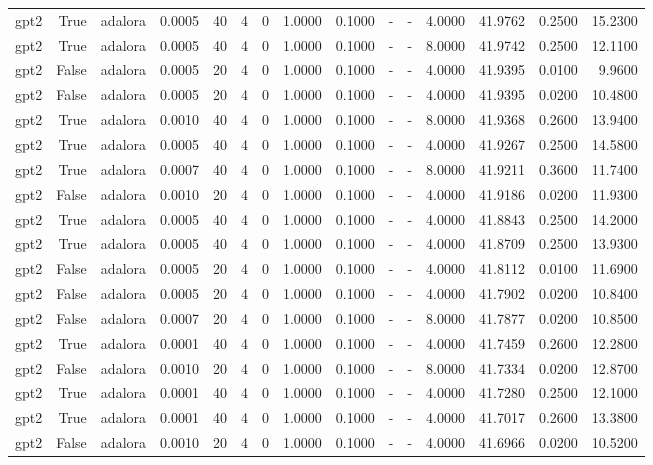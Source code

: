 \begin{tabular}{lrlrrrrrrlllrrr}
gpt2 & True & adalora & 0.0005 & 40 & 4 & 0 & 1.0000 & 0.1000 & - & - & 4.0000 & 41.9762 & 0.2500 & 15.2300 \\
gpt2 & True & adalora & 0.0005 & 40 & 4 & 0 & 1.0000 & 0.1000 & - & - & 8.0000 & 41.9742 & 0.2500 & 12.1100 \\
gpt2 & False & adalora & 0.0005 & 20 & 4 & 0 & 1.0000 & 0.1000 & - & - & 4.0000 & 41.9395 & 0.0100 & 9.9600 \\
gpt2 & False & adalora & 0.0005 & 20 & 4 & 0 & 1.0000 & 0.1000 & - & - & 4.0000 & 41.9395 & 0.0200 & 10.4800 \\
gpt2 & True & adalora & 0.0010 & 40 & 4 & 0 & 1.0000 & 0.1000 & - & - & 8.0000 & 41.9368 & 0.2600 & 13.9400 \\
gpt2 & True & adalora & 0.0005 & 40 & 4 & 0 & 1.0000 & 0.1000 & - & - & 4.0000 & 41.9267 & 0.2500 & 14.5800 \\
gpt2 & True & adalora & 0.0007 & 40 & 4 & 0 & 1.0000 & 0.1000 & - & - & 8.0000 & 41.9211 & 0.3600 & 11.7400 \\
gpt2 & False & adalora & 0.0010 & 20 & 4 & 0 & 1.0000 & 0.1000 & - & - & 4.0000 & 41.9186 & 0.0200 & 11.9300 \\
gpt2 & True & adalora & 0.0005 & 40 & 4 & 0 & 1.0000 & 0.1000 & - & - & 4.0000 & 41.8843 & 0.2500 & 14.2000 \\
gpt2 & True & adalora & 0.0005 & 40 & 4 & 0 & 1.0000 & 0.1000 & - & - & 4.0000 & 41.8709 & 0.2500 & 13.9300 \\
gpt2 & False & adalora & 0.0005 & 20 & 4 & 0 & 1.0000 & 0.1000 & - & - & 4.0000 & 41.8112 & 0.0100 & 11.6900 \\
gpt2 & False & adalora & 0.0005 & 20 & 4 & 0 & 1.0000 & 0.1000 & - & - & 4.0000 & 41.7902 & 0.0200 & 10.8400 \\
gpt2 & False & adalora & 0.0007 & 20 & 4 & 0 & 1.0000 & 0.1000 & - & - & 8.0000 & 41.7877 & 0.0200 & 10.8500 \\
gpt2 & True & adalora & 0.0001 & 40 & 4 & 0 & 1.0000 & 0.1000 & - & - & 4.0000 & 41.7459 & 0.2600 & 12.2800 \\
gpt2 & False & adalora & 0.0010 & 20 & 4 & 0 & 1.0000 & 0.1000 & - & - & 8.0000 & 41.7334 & 0.0200 & 12.8700 \\
gpt2 & True & adalora & 0.0001 & 40 & 4 & 0 & 1.0000 & 0.1000 & - & - & 4.0000 & 41.7280 & 0.2500 & 12.1000 \\
gpt2 & True & adalora & 0.0001 & 40 & 4 & 0 & 1.0000 & 0.1000 & - & - & 4.0000 & 41.7017 & 0.2600 & 13.3800 \\
gpt2 & False & adalora & 0.0010 & 20 & 4 & 0 & 1.0000 & 0.1000 & - & - & 4.0000 & 41.6966 & 0.0200 & 10.5200 \\

\end{tabular}
